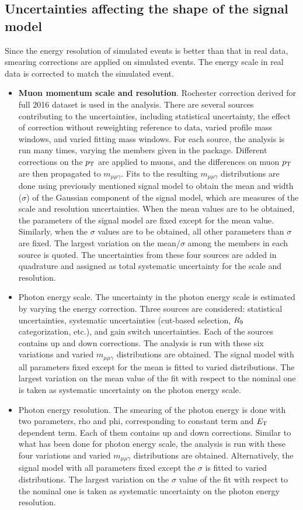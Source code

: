 		\subsection*{Uncertainties affecting the shape of the signal model}
		Since the energy resolution of simulated events is better than that in real data, smearing corrections are applied on simulated events. The energy scale in real data is corrected to match the simulated event.
		\begin{itemize}
		\item \textbf{Muon momentum scale and resolution}. Rochester correction derived for full 2016 dataset is used in the analysis. There are several sources contributing to the uncertainties, including statistical uncertainty, the effect of correction without reweighting reference to data, varied profile mass windows, and varied fitting mass windows. For each source, the analysis is run many times, varying the members given in the package. Different corrections on the $p_{\mathrm{T}}$ are applied to muons, and the differences on muon $p_{\mathrm{T}}$ are then propagated to $m_{\mu\mu\gamma}$. Fits to the resulting $m_{\mu\mu\gamma}$ distributions are done using previously mentioned signal model to obtain the mean and width ($\sigma$) of the Gaussian component of the signal model, which are measures of the scale and resolution uncertainties. When the mean values are to be obtained, the parameters of the signal model are fixed except for the mean value. Similarly, when the $\sigma$ values are to be obtained, all other parameters than $\sigma$ are fixed. 
		The largest variation on the mean/$\sigma$ among the members in each source is quoted. The uncertainties from these four sources are added in quadrature and assigned as total systematic uncertainty for the scale and resolution.
		\item Photon energy scale. The uncertainty in the photon energy scale is estimated by varying the energy correction. Three sources are considered: statistical uncertainties, systematic uncertainties (cut-based selection, $R_\mathrm{9}$ categorization, etc.), and gain switch uncertainties. Each of the sources contains up and down corrections. The analysis is run with these six variations and varied $m_{\mu\mu\gamma}$ distributions are obtained. The signal model with all parameters fixed except for the mean is fitted to varied distributions. The largest variation on the mean value of the fit with respect to the nominal one is taken as systematic uncertainty on the photon energy scale.
		\item Photon energy resolution. The smearing of the photon energy is done with two parameters, rho and phi, corresponding to constant term and $E_{\mathrm{T}}$ dependent term. Each of them contains up and down corrections. Similar to what has been done for photon energy scale, the analysis is run with these four variations and varied $m_{\mu\mu\gamma}$ distributions are obtained. Alternatively, the signal model with all parameters fixed except the $\sigma$ is fitted to varied distributions. The largest variation on the $\sigma$ value of the fit with respect to the nominal one is taken as systematic uncertainty on the photon energy resolution.
		\end{itemize}
		
